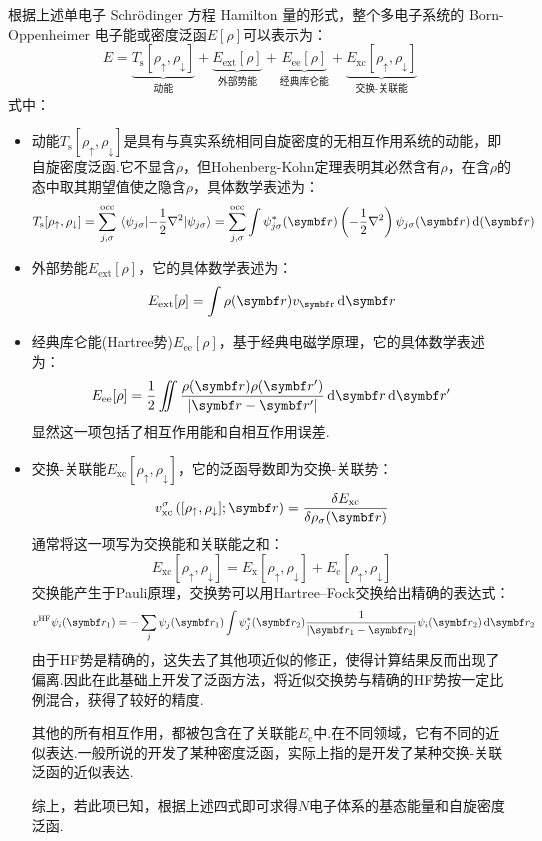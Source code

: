 根据上述单电子 Schrödinger 方程 Hamilton 量的形式，整个多电子系统的 Born-Oppenheimer 电子能或密度泛函$E[\rho]$可以表示为：
\[E = \underbrace{T_\mathrm{s}[\rho_\uparrow,\rho_\downarrow]}_{\text{动能}} + \underbrace{E_\mathrm{ext}[\rho]}_{\text{外部势能}} + \underbrace{E_\mathrm{ee}[\rho]}_{\text{经典库仑能}} + \underbrace{E_\mathrm{xc}[\rho_\uparrow,\rho_\downarrow]}_{\text{交换-关联能}}\]
式中：
\begin{itemize}
    \item 动能$T_\mathrm{s}[\rho_\uparrow,\rho_\downarrow]$是具有与真实系统相同自旋密度的无相互作用系统的动能，即自旋密度泛函.它不显含$\rho$，但Hohenberg-Kohn定理表明其必然含有$\rho$，在含$\rho$的态中取其期望值使之隐含$\rho$，具体数学表述为：
    \[T_\mathrm{s}[\rho_\uparrow,\rho_\downarrow] = \sum_{j,\sigma}^{\mathrm{occ}}\ev{-\frac{1}{2}\nabla^2}{\psi_{j\sigma}} = \sum_{j,\sigma}^{\mathrm{occ}} \int \psi^*_{j\sigma}(\vect{r})\left(-\frac{1}{2}\nabla^2\right)\psi_{j\sigma}(\vect{r}) \dd(\vect{r})\]
    \item 外部势能$E_\mathrm{ext}[\rho]$，它的具体数学表述为：
    \[E_\mathrm{ext}[\rho] = \int \rho(\vect{r}) v_\mathrm{\vect{r}} \dd{\vect{r}}\]
    \item 经典库仑能(Hartree势)$E_\mathrm{ee}[\rho]$，基于经典电磁学原理，它的具体数学表述为：
    \[E_\mathrm{ee}[\rho] = \frac{1}{2}\iint\frac{\rho(\vect{r})\rho(\vect{r}')}{\abs{\vect{r}-\vect{r}'}}\dd{\vect{r}}\dd{\vect{r}'}\]
    显然这一项包括了相互作用能和自相互作用误差.
    \item 交换-关联能$E_\mathrm{xc}[\rho_\uparrow,\rho_\downarrow]$，它的泛函导数即为交换-关联势：
    \[v^{\sigma}_\mathrm{xc}\left([\rho_\uparrow,\rho_\downarrow];\vect{r}\right) = \frac{\delta E_\mathrm{xc}}{\delta \rho_{\sigma}(\vect{r})}\]
    通常将这一项写为交换能和关联能之和：
    \[E_\mathrm{xc}[\rho_\uparrow,\rho_\downarrow] = E_\mathrm{x}[\rho_\uparrow,\rho_\downarrow] + E_\mathrm{c}[\rho_\uparrow,\rho_\downarrow]\]
    交换能产生于Pauli原理，交换势可以用Hartree–Fock交换给出精确的表达式：
    \[v^\mathrm{HF}\psi_i(\vect{r}_1) = -\sum_{j}^{}\psi_j(\vect{r}_1)\int\psi^*_j(\vect{r}_2)\frac{1}{\abs{\vect{r}_1-\vect{r}_2}}\psi_i(\vect{r}_2) \dd{\vect{r}_2}\]
    由于HF势是精确的，这失去了其他项近似的修正，使得计算结果反而出现了偏离.因此在此基础上开发了泛函方法，将近似交换势与精确的HF势按一定比例混合，获得了较好的精度.

    其他的所有相互作用，都被包含在了关联能$E_\mathrm{c}$中.在不同领域，它有不同的近似表达.一般所说的开发了某种密度泛函，实际上指的是开发了某种交换-关联泛函的近似表达.

    综上，若此项已知，根据上述四式即可求得$N$电子体系的基态能量和自旋密度泛函.
\end{itemize}

